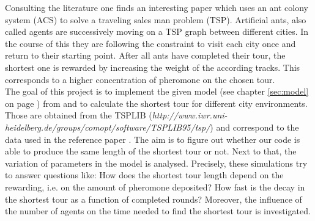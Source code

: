 Consulting the literature \cite{paper} one finds an interesting paper which uses an ant colony system (ACS) to solve a traveling sales man problem (TSP). Artificial ants, also called agents are successively moving on a TSP graph between different cities. In the course of this they are following the constraint to visit each city once and return to their starting point. After all ants have completed their tour, the shortest one is rewarded by increasing the weight of the according tracks. This corresponds to a higher concentration of pheromone on the chosen tour.\\
The goal of this project is to implement the given model (see chapter \ref{sec:model} on page \pageref{sec:model}) from \cite{paper} and to calculate the shortest tour for different city environments. Those are obtained from the TSPLIB (\emph{http://www.iwr.uni-heidelberg.de/groups/comopt/software/TSPLIB95/tsp/}) and correspond to the data used in the reference paper \cite{paper}. The aim is to figure out whether our code is able to produce the same length of the shortest tour or not. Next to that, the variation of parameters in the model is analysed. Precisely, these simulations try to answer questions like: How does the shortest tour length depend on the rewarding, i.e. on the amount of pheromone deposited? How fast is the decay in the shortest tour as a function of completed rounds? Moreover, the influence of the number of agents on the time needed to find the shortest tour is investigated.